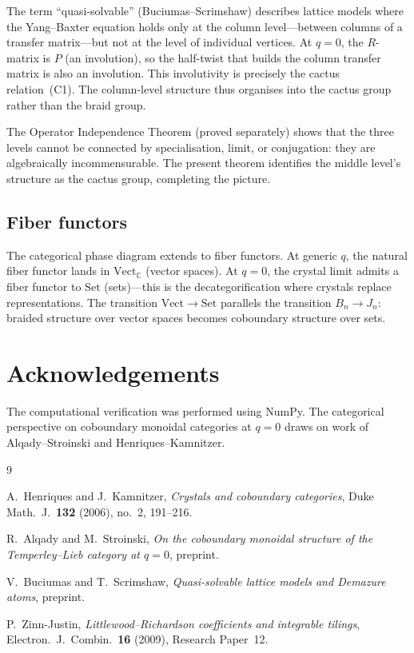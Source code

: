 \documentclass[11pt]{article}
\theoremstyle{remark}
\newcommand{\CC}{\mathbb{C}}
\begin{document}
The term ``quasi-solvable'' (Buciumas--Scrimshaw) describes lattice models
where the Yang--Baxter equation holds only at the column level---between
columns of a transfer matrix---but not at the level of individual vertices.
At $q = 0$, the $R$-matrix is $P$ (an involution), so the half-twist that
builds the column transfer matrix is also an involution. This involutivity
is precisely the cactus relation~(C1). The column-level structure thus
organises into the cactus group rather than the braid group.

The Operator Independence Theorem (proved separately) shows that the
three levels cannot be connected by specialisation, limit, or conjugation:
they are algebraically incommensurable. The present theorem identifies
the middle level's structure as the cactus group, completing the picture.

\subsection*{Fiber functors}

The categorical phase diagram extends to fiber functors. At generic $q$,
the natural fiber functor lands in $\mathrm{Vect}_\CC$ (vector spaces).
At $q = 0$, the crystal limit admits a fiber functor to $\mathrm{Set}$
(sets)---this is the decategorification where crystals replace
representations. The transition $\mathrm{Vect} \to \mathrm{Set}$
parallels the transition $B_n \to J_n$: braided structure over vector
spaces becomes coboundary structure over sets.

\section*{Acknowledgements}
The computational verification was performed using NumPy. The categorical
perspective on coboundary monoidal categories at $q = 0$ draws on work
of Alqady--Stroinski and Henriques--Kamnitzer.

\begin{thebibliography}{9}

A.~Henriques and J.~Kamnitzer,
\emph{Crystals and coboundary categories},
Duke Math.\ J.\ \textbf{132} (2006), no.~2, 191--216.

R.~Alqady and M.~Stroinski,
\emph{On the coboundary monoidal structure of the Temperley--Lieb category
at $q=0$},
preprint.

V.~Buciumas and T.~Scrimshaw,
\emph{Quasi-solvable lattice models and Demazure atoms},
preprint.

P.~Zinn-Justin,
\emph{Littlewood--Richardson coefficients and integrable tilings},
Electron.\ J.\ Combin.\ \textbf{16} (2009), Research Paper~12.

\end{thebibliography}
\end{document}
